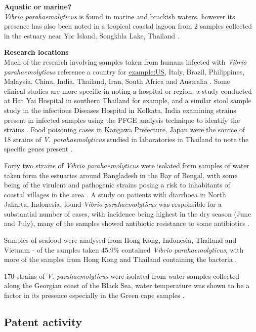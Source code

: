 \documentclass[openany]{book}
\theoremstyle{definition}
\theoremstyle{definition}
\theoremstyle{definition}
\theoremstyle{remark}
\begin{document}
\textbf{Aquatic or marine?}\\
\emph{Vibrio parahaemolyticus} is found in marine and brackish waters,
however its presence has also been noted in a tropical coastal lagoon
from 2 samples collected in the estuary near Yor Island, Songkhla Lake,
Thailand \citep{Thongchankaew_2011}.

\textbf{Research locations}\\
Much of the research involving samples taken from humans infected with
\emph{Vibrio parahaemolyticus} reference a country for \url{example:US},
Italy, Brazil, Philippines, Malaysia, China, India, Thailand, Iran,
South Africa and Australia \citep{Elmahdi_2016}. Some clinical studies
are more specific in noting a hospital or region: a study conducted at
Hat Yai Hospital in southern Thailand \citep{Wootipoom_2007} for
example, and a similar stool sample study in the infectious Diseases
Hospital in Kolkata, India examining strains present in infected samples
using the PFGE analysis technique to identify the strains
\citep{Pazhani_2014}. Food poisoning cases in Kangawa Prefecture, Japan
were the source of 18 strains of \emph{V. parahaemolyticus} studied in
laboratories in Thailand to note the specific genes present
\citep{Okitsu_1997}.

Forty two strains of \emph{Vibrio parahaemolyticus} were isolated form
samples of water taken form the estuaries around Bangladesh in the Bay
of Bengal, with some being of the virulent and pathogenic strains posing
a risk to inhabitants of coastal villages in the area \citep{Alam_2009}.
A study on patients with diarrhoea in North Jakarta, Indonesia, found
\emph{Vibrio parahaemolyticus} was responsible for a substantial number
of cases, with incidence being highest in the dry season (June and
July), many of the samples showed antibiotic resistance to some
antibiotics \citep{Lesmana_2001}.

Samples of seafood were analysed from Hong Kong, Indonesia, Thailand and
Vietnam - of the samples taken 45.9\% contained \emph{Vibrio
parahaemolyticus}, with more of the samples from Hong Kong and Thailand
containing the bacteria \citep{Wong_1999}.

170 strains of \emph{V. parahaemolyticus} were isolated from water
samples collected along the Georgian coast of the Black Sea, water
temperature was shown to be a factor in its presence especially in the
Green cape samples \citep{Haley_2014}.

\hypertarget{patent-activity-9}{%
\subsection{Patent activity}\label{patent-activity-9}}
\end{document}

